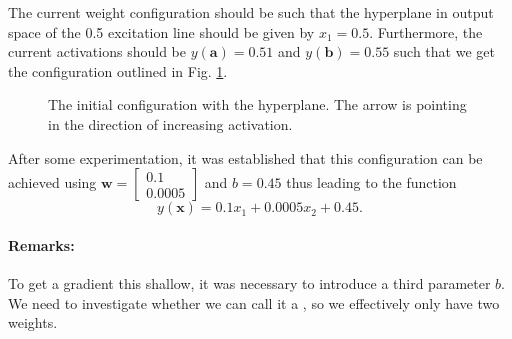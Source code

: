\documentclass{article}
\renewcommand\vec{\mathbf}
\begin{document}
The current weight configuration should be such that the hyperplane in output space of the 0.5 excitation line should be given by $x_1=0.5$.
Furthermore, the current activations should be $y(\vec{a}) = 0.51$ and $y(\vec{b}) = 0.55$ such that we get the configuration outlined in Fig. \ref{week5:initial}.
\begin{figure}[h]
    
    \centering


    \caption{The initial configuration with the hyperplane. The arrow is pointing in the direction of increasing activation.}
    \label{week5:initial}
\end{figure}

After some experimentation, it was established that this configuration can be achieved using
$\vec{w} = \begin{bmatrix}
    0.1 \\ 0.0005
\end{bmatrix}$
and $b = 0.45$ thus leading to the function
\begin{equation*}
    y(\vec{x}) = 0.1 x_1 + 0.0005 x_2 + 0.45.
\end{equation*}

\paragraph{Remarks:}
To get a gradient this shallow, it was necessary to introduce a third parameter $b$. 
We need to investigate whether we can call it a , so we effectively only have two weights.
\end{document}
